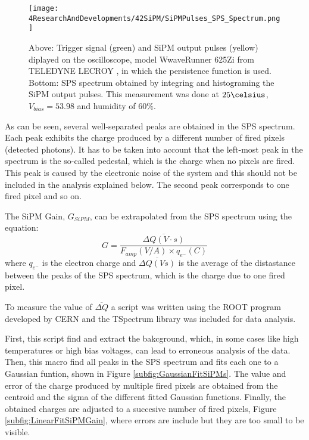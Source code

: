 \begin{figure}[hbtp]
\centering
\texttt{[image: 4ResearchAndDevelopments/42SiPM/SiPMPulses\_SPS\_Spectrum.png]}
\caption{Above: Trigger signal (green) and SiPM output pulses (yellow) diplayed on the oscilloscope, model WwaveRunner 625Zi from TELEDYNE LECROY \cite{OscilloscopeIFIMED}, in which the persistence function is used. Bottom: SPS spectrum obtained by integring and histograming the SiPM output pulses. This measurement was done at $25\celsius$, $V_{bias}=53.98$ and humidity of $60\%$. \label{fig:OutputPulses_SPSspectrum}}
\end{figure}

As can be seen, several well-separated peaks are obtained in the SPS spectrum. Each peak exhibits the charge produced by a different number of fired pixels (detected photons). It has to be taken into account that the left-most peak in the spectrum is the so-called pedestal, which is the charge when no pixels are fired. This peak is caused by the electronic noise of the system and this should not be included in the analysis explained below. The second peak corresponds to one fired pixel and so on.

The SiPM Gain, $G_{SiPM}$, can be extrapolated from the SPS spectrum using the equation:
\begin{equation}
G=\frac{\overline{\Delta Q (V \cdot{} s)}}{F_{amp}(V/A) \times q_{e^-}(C)}
\label{SiPMGain}
\end{equation}
where $q_{e^-}$ is the electron charge and $\overline{\Delta Q (Vs)}$ is the average of the distastance between the peaks of the SPS spectrum, which is the charge due to one fired pixel. 

To measure the value of $\overline{\Delta Q}$ a script was written using the ROOT program \cite{ROOTWebPage} developed by CERN and the TSpectrum library was included for data analysis. 

First, this script find and extract the bakcground, which, in some cases like high temperatures or high bias voltages, can lead to erroneous analysis of the data. Then, this macro find all peaks in the SPS spectrum and fits each one to a Gaussian funtion, shown in Figure \ref{subfig:GaussianFitSiPMs}. The value and error of the charge produced by multiple fired pixels are obtained from the centroid and the sigma of the different fitted Gaussian functions. Finally, the obtained charges are adjusted to a succesive number of fired pixels, Figure \ref{subfig:LinearFitSiPMGain}, where errors are include but they are too small to be visible.

